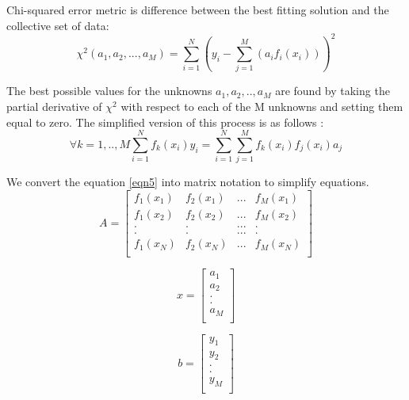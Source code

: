 \documentclass{article}
\begin{document}
Chi-squared error metric is difference between the best fitting solution and the collective set of data:
\begin{equation}\label{eqn4}
{\chi}^2(a_1,a_2,...,a_M) = \sum_{i=1}^N \left(y_i - \sum_{j=1}^M(a_if_i(x_i))\right)^2
\end{equation}

The best possible values for the unknowns $a_1,a_2,..,a_M$ are found by taking the partial derivative of ${\chi}^2$ with respect to each of the M unknowns and setting them equal to zero.
The simplified version of this process is as follows :
\begin{equation}\label{eqn5}
\forall k = 1,..,M \sum_{i=1}^N f_k(x_i)y_i = \sum_{i=1}^N\sum_{j=1}^Mf_k(x_i)f_j(x_i)a_j
\end{equation}

We convert the equation \ref{eqn5} into matrix notation to simplify equations.\\
\begin{equation}\label{eqn6}
A = 
\begin{bmatrix}
f_1(x_1) & f_2(x_1) & ... & f_M(x_1) \\
f_1(x_2) & f_2(x_2) & ... & f_M(x_2) \\
. & . & ... & . \\
. & . & ... & . \\
f_1(x_N) & f_2(x_N) & ... & f_M(x_N) \\
\end{bmatrix}
\end{equation}

\begin{equation}\label{eqn7}
x = 
\begin{bmatrix}
a_1 \\a_2 \\. \\. \\a_M \\
\end{bmatrix}
\end{equation}

\begin{equation}\label{eqn8}
b = 
\begin{bmatrix}
y_1 \\y_2 \\. \\. \\y_M \\
\end{bmatrix}
\end{equation}
\end{document}
